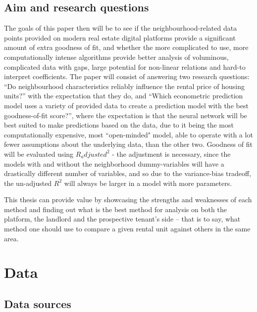 \documentclass[12pt]{report}
\begin{document}
\subsection{Aim and research questions}

The goals of this paper then will be to see if the neighbourhood-related data points provided on modern real estate digital platforms provide a significant amount of extra goodness of fit, and whether the more complicated to use, more computationally intense algorithms provide better analysis of voluminous, complicated data with gaps, large potential for non-linear relations and hard-to interpret coefficients. The paper will consist of answering two research questions: “Do neighbourhood characteristics reliably influence the rental price of housing units?”  with the expectation that they do, and “Which econometric prediction model uses a variety of provided data to create a prediction model with the best goodness-of-fit score?”, where the expectation is that the neural network will be best suited to make predictions based on the data, due to it being the most computationally expensive, most ``open-minded" model, able to operate with a lot fewer assumptions about the underlying data, than the other two. Goodness of fit will be evaluated using $R_adjusted^2$ - the adjustment is necessary, since the models with and without the neighborhood dummy-variables will have a drastically different number of variables, and so due to the variance-bias tradeoff, the un-adjusted $R^2$ will always be larger in a model with more parameters.

This thesis can provide value by showcasing the strengths and weaknesses of each method and finding out what is the best method for analysis on both the platform, the landlord and the prospective tenant’s side – that is to say, what method one should use to compare a given rental unit against others in the same area.

\section{Data}

\subsection{Data sources}
\end{document}
